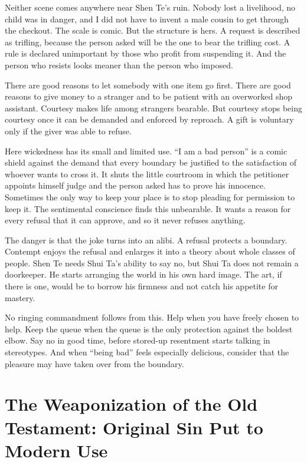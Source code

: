 \documentclass[12pt,a4paper]{book}
\begin{document}
Neither scene comes anywhere near Shen Te's ruin. Nobody lost a livelihood, no child was in danger, and I did not have to invent a male cousin to get through the checkout. The scale is comic. But the structure is hers. A request is described as trifling, because the person asked will be the one to bear the trifling cost. A rule is declared unimportant by those who profit from suspending it. And the person who resists looks meaner than the person who imposed.

There are good reasons to let somebody with one item go first. There are good reasons to give money to a stranger and to be patient with an overworked shop assistant. Courtesy makes life among strangers bearable. But courtesy stops being courtesy once it can be demanded and enforced by reproach. A gift is voluntary only if the giver was able to refuse.

Here wickedness has its small and limited use. ``I am a bad person'' is a comic shield against the demand that every boundary be justified to the satisfaction of whoever wants to cross it. It shuts the little courtroom in which the petitioner appoints himself judge and the person asked has to prove his innocence. Sometimes the only way to keep your place is to stop pleading for permission to keep it. The sentimental conscience finds this unbearable. It wants a reason for every refusal that it can approve, and so it never refuses anything.

The danger is that the joke turns into an alibi. A refusal protects a boundary. Contempt enjoys the refusal and enlarges it into a theory about whole classes of people. Shen Te needs Shui Ta's ability to say no, but Shui Ta does not remain a doorkeeper. He starts arranging the world in his own hard image. The art, if there is one, would be to borrow his firmness and not catch his appetite for mastery.

No ringing commandment follows from this. Help when you have freely chosen to help. Keep the queue when the queue is the only protection against the boldest elbow. Say no in good time, before stored-up resentment starts talking in stereotypes. And when ``being bad'' feels especially delicious, consider that the pleasure may have taken over from the boundary.


\chapter[The Weaponization of the Old Testament]{The Weaponization of the Old Testament: Original Sin Put to Modern Use}
\label{chap:weaponized-original-sin}
\end{document}
